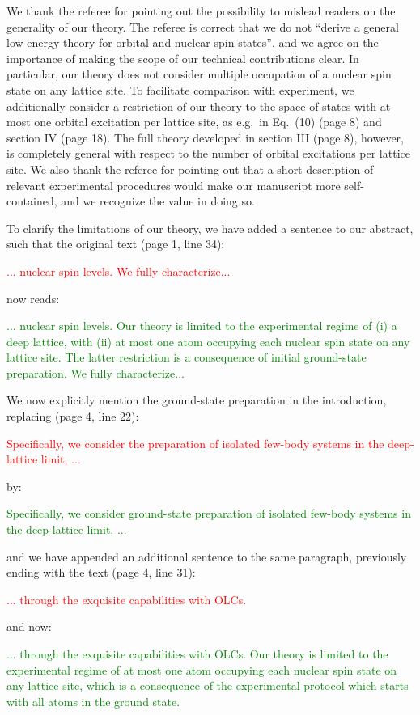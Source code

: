 \documentclass[preprint]{revtex4-1}
\newcommand{\1}{\mathds{1}}
\newcommand{\red}[1]{\textcolor{red}{#1}}
\newcommand{\green}[1]{\textcolor{green}{#1}}
\begin{document}
\begin{enumerate}
  We thank the referee for pointing out the possibility to mislead
  readers on the generality of our theory.  The referee is correct
  that we do not ``derive a general low energy theory for orbital and
  nuclear spin states'', and we agree on the importance of making the
  scope of our technical contributions clear.  In particular, our
  theory does not consider multiple occupation of a nuclear spin state
  on any lattice site.  To facilitate comparison with experiment, we
  additionally consider a restriction of our theory to the space of
  states with at most one orbital excitation per lattice site, as
  e.g.~in Eq.~(10) (page 8) and section IV (page 18).  The full theory
  developed in section III (page 8), however, is completely general
  with respect to the number of orbital excitations per lattice site.
  We also thank the referee for pointing out that a short description
  of relevant experimental procedures would make our manuscript more
  self-contained, and we recognize the value in doing so.

  To clarify the limitations of our theory, we have added a sentence
  to our abstract, such that the original text (page 1, line 34):

  \red{... nuclear spin levels.  We fully characterize...}

  now reads:

  \green{... nuclear spin levels.  Our theory is limited to the
    experimental regime of (i) a deep lattice, with (ii) at most one
    atom occupying each nuclear spin state on any lattice site.  The
    latter restriction is a consequence of initial ground-state
    preparation.  We fully characterize...}

  We now explicitly mention the ground-state preparation in the
  introduction, replacing (page 4, line 22):

  \red{Specifically, we consider the preparation of isolated few-body
    systems in the deep-lattice limit, ...}

  by:

  \green{Specifically, we consider ground-state preparation of
    isolated few-body systems in the deep-lattice limit, ...}

  and we have appended an additional sentence to the same paragraph,
  previously ending with the text (page 4, line 31):

  \red{... through the exquisite capabilities with OLCs.}

  and now:

  \green{... through the exquisite capabilities with OLCs.  Our theory
    is limited to the experimental regime of at most one atom
    occupying each nuclear spin state on any lattice site, which is a
    consequence of the experimental protocol which starts with all
    atoms in the ground state.}


\end{enumerate}
\end{document}
